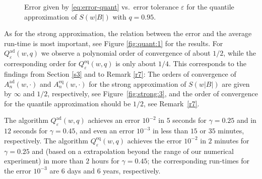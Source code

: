 \documentclass[a4paper]{amsart}
\theoremstyle{definition}
\theoremstyle{plain}
\newcommand{\adap}{\ensuremath{ \mathrm{ad} }}
\newcommand{\equi}{\ensuremath{ \mathrm{eq} }}
\begin{document}
\begin{figure}[htb]
	\caption{Error given by \eqref{eq:error-quant} vs.\ error tolerance $\varepsilon$
		for the quantile approximation of $S(w|B|)$ with $q=0.95$.}
	\label{fig:quant:2}
\end{figure}

As for the strong approximation, the relation between the error
and the average run-time is most important, see
Figure \ref{fig:quant:1} for the results.
For $Q^\adap_{\varepsilon}(w, q)$ we observe a polynomial order of
convergence of about $1/2$, while the corresponding order for
$Q^\equi_{\varepsilon}(w, q)$ is only about $1/4$. This corresponds
to the findings from Section \ref{s3} and to Remark \ref{r7}:
The orders of convergence of $A_n^\adap(w,\cdot)$ and
$A^\equi_n(w,\cdot)$ for the strong approximation of $S(w|B|)$
are given by $\infty$ and $1/2$, respectively,
see Figure~\ref{fig:strong:3}, and the order of convergence for the
quantile approximation should be $1/2$, see Remark~\ref{r7}.

The algorithm $Q^\adap_{\varepsilon}(w, q)$ achieves an error $10^{-2}$
in $5$ seconds for $\gamma=0.25$ and in $12$ seconds for $\gamma =
0.45$, and even an error $10^{-3}$ in less than $15$ or $35$
minutes, respectively.
The algorithm $Q^\equi_{\varepsilon}(w, q)$ achieves the error $10^{-2}$
in $2$ minutes for $\gamma=0.25$ and
(based on a extrapolation beyond the range of our numerical experiment)
in more than $2$ hours for $\gamma = 0.45$; the corresponding
run-times for the error $10^{-3}$ are
6 days and 6 years, respectively.
\end{document}
